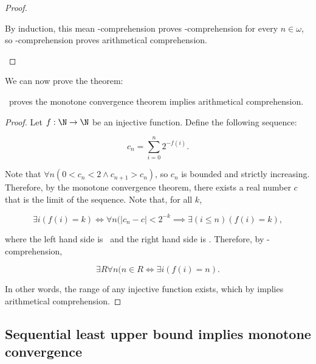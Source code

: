 \documentclass[../main.tex]{memoir}
\begin{document}
\begin{proof}
\begin{description}
    By induction, this mean \re-comprehension proves -comprehension for every $n \in \omega$, so \re-comprehension proves arithmetical comprehension.
  \end{description}
\end{proof}

We can now prove the theorem:

\begin{theorem}
  \label{thm:mc-aca}
  \rca\ proves the monotone convergence theorem implies arithmetical comprehension.
\end{theorem}
\begin{proof}
  Let $f:\N \to \N$ be an injective function. Define the following sequence:

  \[ c_n = \sum_{i = 0}^n 2^{-f(i)}. \]

  Note that $\forall n (0 < c_n < 2 \land c_{n + 1} > c_n)$, so $c_n$ is bounded and strictly increasing. Therefore, by the monotone convergence theorem, there exists a real number $c$ that is the limit of the sequence. Note that, for all $k$,

  \[ \exists i (f(i) = k) \iff \forall n (|c_n - c| < 2^{-k} \implies \exists (i \le n) (f(i) = k), \]

  where the left hand side is \re\ and the right hand side is \core. Therefore, by \rec-comprehension,

  \[ \exists R \forall n (n \in R \iff \exists i (f(i) = n). \]

  In other words, the range of any injective function exists, which by  implies arithmetical comprehension.
\end{proof}

\subsection{Sequential least upper bound implies monotone convergence}
\end{document}

